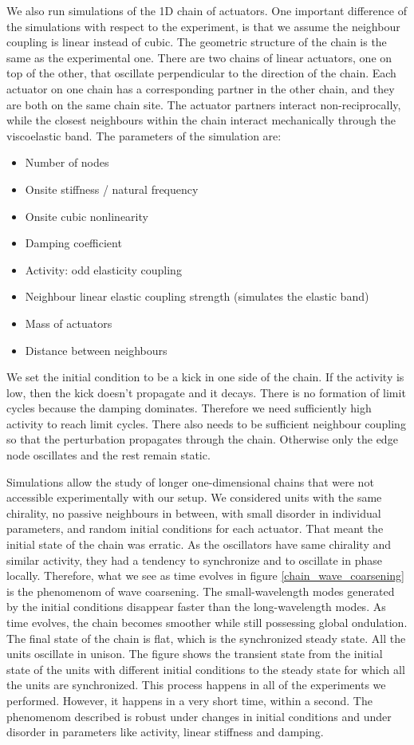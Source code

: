 \documentclass[11pt, a4paper]{article} %
\begin{document}
We also run simulations of the 1D chain of actuators. One important difference
of the simulations with respect to the experiment, is that we assume the neighbour 
coupling is linear instead of cubic. The geometric structure of the chain is the same as the experimental one.
There are two chains of linear actuators, one on top of the other, that oscillate perpendicular to the direction of the chain. 
Each actuator on one chain has a corresponding partner in the other chain, and they are both on the same chain site. 
The actuator partners interact non-reciprocally, while the closest neighbours within the chain interact mechanically through 
the viscoelastic band. 
The parameters of the simulation are: 
\begin{itemize}
    \item Number of nodes
    \item Onsite stiffness / natural frequency
    \item Onsite cubic nonlinearity 
    \item Damping coefficient
    \item Activity: odd elasticity coupling
    \item Neighbour linear elastic coupling strength (simulates the elastic band)
    \item Mass of actuators
    \item Distance between neighbours
\end{itemize}
We set the initial condition to be a kick in one side of the chain. If the activity is 
low, then the kick doesn't propagate and it decays. There is no formation of limit cycles because the damping dominates. 
Therefore we need sufficiently high activity to reach limit cycles. There also needs to be 
sufficient neighbour coupling so that the perturbation propagates through the chain. Otherwise 
only the edge node oscillates and the rest remain static. 

Simulations allow the study of longer one-dimensional chains that were not accessible experimentally with our setup. 
We considered units with the same chirality, no passive neighbours in between, 
with small disorder in individual parameters, and random initial conditions for each actuator. 
That meant the initial state of the chain was erratic. As the oscillators have same chirality and similar activity, they 
had a tendency to synchronize and to oscillate in phase locally. Therefore, what we see as time evolves in figure \ref{chain_wave_coarsening} 
is the phenomenom of wave coarsening. The small-wavelength modes generated by the initial conditions disappear faster than the 
long-wavelength modes. As time evolves, the chain becomes smoother while still possessing global ondulation. The final state of the 
chain is flat, which is the synchronized steady state. All the units oscillate in unison. 
The figure shows the transient state from the initial state of the units with different initial 
conditions to the steady state for which all the units are synchronized. This process happens in all of the experiments we 
performed. However, it happens in a very short time, within a second. The phenomenom described is robust under changes in initial 
conditions and under disorder in parameters like activity, linear stiffness and damping. 
\end{document}
